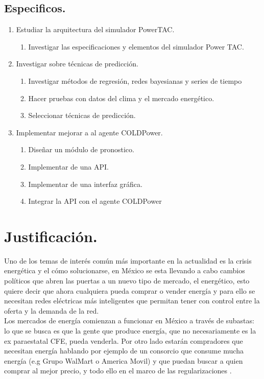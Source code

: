 \subsection{Especificos.}
\renewcommand{\labelenumi}{$\bullet$ }
\renewcommand{\labelenumii}{\alph{enumii})}
\begin{enumerate}
    \item Estudiar la arquitectura del simulador PowerTAC. 
    \begin{enumerate}
        \item Investigar las especificaciones y elementos del simulador Power TAC.
    \end{enumerate} 
    \item Investigar sobre técnicas de predicción.
    \begin{enumerate}
        \item Investigar métodos de regresión, redes bayesianas y series de tiempo
		\item Hacer pruebas con datos del clima y el mercado energético.
		\item Seleccionar técnicas de predicción.
    \end{enumerate}
    \item Implementar mejorar a al agente COLDPower.
        \begin{enumerate}
        \item Diseñar un módulo de pronostico.
		\item Implementar de una API.
		\item Implementar de una interfaz gráfica.
		\item Integrar la API con el agente COLDPower
    \end{enumerate}
\end{enumerate}

\section{Justificación.}
Uno de los temas de interés común más importante en la actualidad es la crisis energética y el cómo solucionarse, en México se esta llevando a cabo cambios políticos que abren las puertas a un nuevo tipo de mercado, el energético, esto quiere decir que ahora cualquiera pueda comprar o vender energía y para ello se necesitan redes eléctricas más inteligentes que permitan tener con control entre la oferta y la demanda de la red.
\\

Los mercados de energía comienzan a funcionar en México a través de subastas: lo que se busca es que la gente que produce energía, que no necesariamente es la ex paraestatal CFE, pueda venderla. Por otro lado estarán compradores  que necesitan energía hablando por ejemplo de un consorcio que consume mucha energía (e.g Grupo WalMart o America Movil) y que puedan buscar a quien comprar al mejor precio, y todo ello en el marco de las regularizaciones \cite{GRiveraProyectoDeIADelInaoe}.\\


